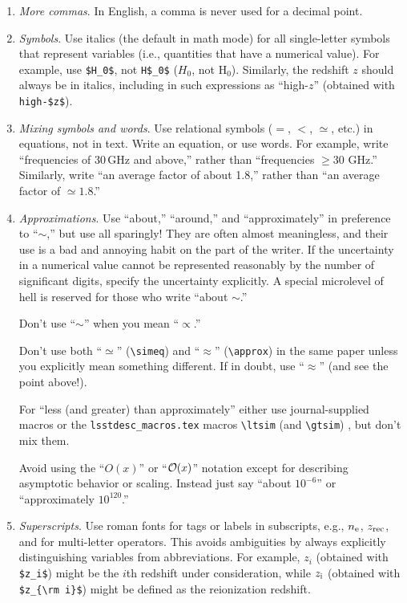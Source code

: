 \documentclass[letterpaper,11pt]{article}
\begin{document}
\begin{enumerate}
\item {\it More commas\/}. In English, a comma is never used for a decimal
point. 

\item {\it Symbols\/}. Use italics (the default in math mode)  for all
single-letter symbols that represent variables (i.e., quantities that have a
numerical value).  For example, use {\tt \$H\_0\$}, not {\tt H\$\_0\$}
($H_0$, not H$_0$).  Similarly, the redshift $z$ should always be in italics,
including in such expressions as ``high-$z$'' (obtained with \verb|high-$z$|).  

\item {\it Mixing symbols and words\/}.   Use relational symbols ($=$,  $<$, $\simeq$, etc.) in equations, not in
text.   Write an equation, or use words.  For example, write ``frequencies of
30\,GHz and above,'' rather than ``frequencies $\ge 30$ GHz.''  Similarly,
write ``an average factor of about 1.8,'' rather than ``an average factor of
$\simeq 1.8$.''  %

\item {\it Approximations\/}.
Use ``about,'' ``around,'' and ``approximately'' in preference to
``$\sim$,'' but use all sparingly!  They are often almost meaningless, and
their use is a bad and annoying habit on the part of the writer.  If the
uncertainty in a numerical value cannot be represented reasonably by the
number of significant digits, specify the uncertainty explicitly.  A special
microlevel of hell is reserved for those who write ``about $\sim$.''

Don't use ``$\sim$''  when you mean ``$\propto$.''

Don't use both ``$\simeq$'' (\verb|\simeq|) and ``$\approx$'' (\verb|\approx|) in
the same paper unless you explicitly mean something different.  If in doubt,
use ``$\approx$'' (and see the point above!).

For ``less (and greater) than approximately'' either use journal-supplied macros or the {\tt lsstdesc\_macros.tex} macros
\verb|\ltsim| (and \verb|\gtsim|) \FIXME{[to be added]}, but don't mix them.

Avoid using the ``$O(x)$'' or ``${\cal O}(x)$'' notation except for describing
asymptotic behavior or scaling.  Instead just say ``about $10^{-6}$'' or
``approximately $10^{120}$.''

\item {\it Superscripts\/}.
Use roman fonts for tags or labels in subscripts, e.g., $n_{\rm e}$,
$z_{\rm rec}$, and for multi-letter operators.  This avoids ambiguities by
always explicitly distinguishing variables from abbreviations.  For example,
$z_i$ (obtained with \verb|$z_i$|) might be the $i$th redshift under consideration,
while $z_{\rm i}$ (obtained with \verb|$z_{\rm i}$|) might be defined as the
reionization redshift.


\end{enumerate}
\end{document}
